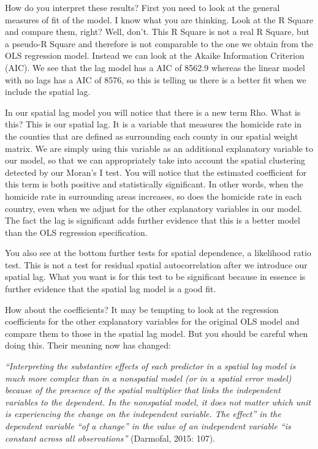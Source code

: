 \documentclass[]{book}
\begin{document}
How do you interpret these results? First you need to look at the general measures of fit of the model. I know what you are thinking. Look at the R Square and compare them, right? Well, don't. This R Square is not a real R Square, but a pseudo-R Square and therefore is not comparable to the one we obtain from the OLS regression model. Instead we can look at the Akaike Information Criterion (AIC). We see that the lag model has a AIC of 8562.9 whereas the linear model with no lags has a AIC of 8576, so this is telling us there is a better fit when we include the spatial lag.

In our spatial lag model you will notice that there is a new term Rho. What is this? This is our spatial lag. It is a variable that measures the homicide rate in the counties that are defined as surrounding each county in our spatial weight matrix. We are simply using this variable as an additional explanatory variable to our model, so that we can appropriately take into account the spatial clustering detected by our Moran's I test. You will notice that the estimated coefficient for this term is both positive and statistically significant. In other words, when the homicide rate in surrounding areas increases, so does the homicide rate in each country, even when we adjust for the other explanatory variables in our model. The fact the lag is significant adds further evidence that this is a better model than the OLS regression specification.

You also see at the bottom further tests for spatial dependence, a likelihood ratio test. This is not a test for residual spatial autocorrelation after we introduce our spatial lag. What you want is for this test to be significant because in essence is further evidence that the spatial lag model is a good fit.

How about the coefficients? It may be tempting to look at the regression coefficients for the other explanatory variables for the original OLS model and compare them to those in the spatial lag model. But you should be careful when doing this. Their meaning now has changed:

\emph{``Interpreting the substantive effects of each predictor in a spatial lag model is much more complex than in a nonspatial model (or in a spatial error model) because of the presence of the spatial multiplier that links the independent variables to the dependent. In the nonspatial model, it does not matter which unit is experiencing the change on the independent variable. The effect'' in the dependent variable ``of a change'' in the value of an independent variable ``is constant across all observations''} (Darmofal, 2015: 107).
\end{document}
